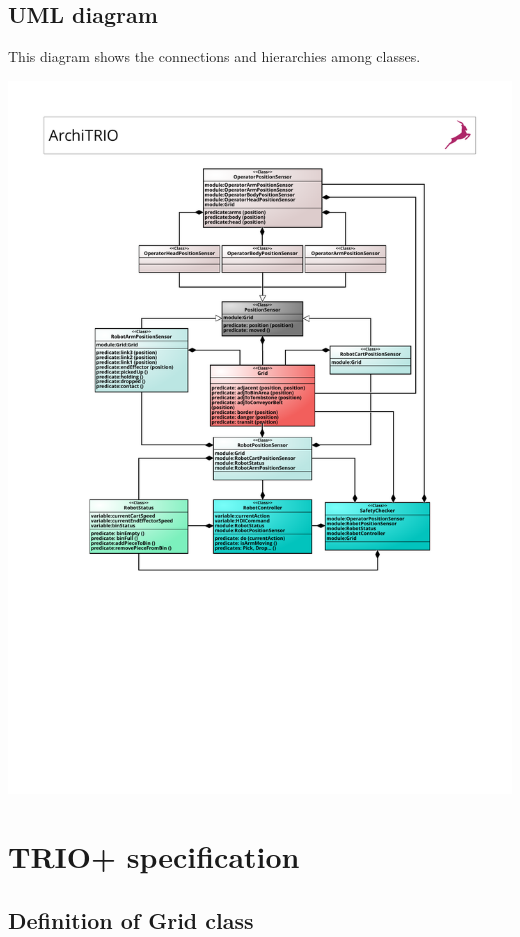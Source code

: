 \documentclass[a4paper]{article}
\begin{document}
\subsection{UML diagram}
This diagram shows the connections and hierarchies among classes.
\begin{center}
    \includegraphics[width=16.5cm]{images/ArchiTRIO}
\end{center}
\clearpage
\section{TRIO+ specification}

\subsection{Definition of Grid class}

\end{document}
